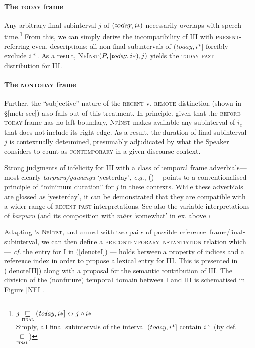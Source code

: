 \paragraph[Hodiernal]{The \textsc{today} frame} Any arbitrary final subinterval $ j $ of $ (\textsl{today},i*) $ necessarily overlaps with speech time.\footnote{
	$ j \underset{\textsc{final}}{\sqsubseteq}(\mathit{today},i*]\leftrightarrow j\circ i*$\\
	Simply, all final subintervals of the interval $ (\textit{today},i*] $ contain $ i* $ (by def. $ \underset{\textsc{final}}{\sqsubseteq} $)
}
From this, we can simply derive the incompatibility of \gls{III} with \textsc{present}-referring event descriptions: all non-final subintervals of $ (\textit{today}, i*] $ forcibly exclude $ i* $. %
 As a result, \textsc{NfInst}$ (P,{\small [\textsl{today},i*)},j) $ yields the \textsc{today past }distribution for \gls{III}.

\paragraph[Prehodiernal]{The \textsc{nontoday} frame} Further, the ``subjective'' nature of the \textsc{recent} v. \textsc{remote} distinction (shown in §\ref{metr-sec}) also falls out of this treatment. In principle, given that the \textsc{before-today} frame has no left boundary, \textsc{NfInst} makes available any subinterval of $ i_c $ that does not include its right edge. As a result, the duration of final subinterval $ j $ is contextually determined, presumably adjudicated by what the Speaker considers to count as \textsc{contemporary} in a given discourse context. 


Strong judgments of infelicity for \gls{III} with a class of temporal frame adverbials---most clearly \textit{barpuru\slash yawungu} `yesterday', \textit{e.g.}, () ---points to a conventionalised principle of ``minimum duration'' for $ j $ in these contexts. While these adverbials are glossed as `yesterday', it can be demonstrated that they are compatible with a wider range of \textsc{recent past} interpretations. See also the variable interpretations of \textit{barpuru} (and its composition with \textit{märr} `somewhat' in ex.  above.)



Adapting \citeauthor{Condoravdi2014}'s \textsc{NfInst}, and armed with two pairs of possible reference~frame/final-subinterval, we can then define a \textsc{precontemporary instantiation} relation which --- \textit{cf.} the entry for \gls{I} in (\ref{denoteI}) --- holds between a property of indices and a reference index in order to propose a lexical entry for \gls{III}. This is presented in (\ref{denoteIII}) along with a proposal for the semantic contribution of \gls{III}. The division of the (nonfuture) temporal domain between \gls{I} and \gls{III} is schematised in Figure \ref{NFI}.

